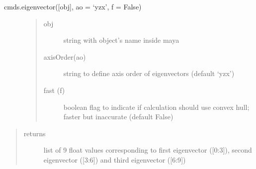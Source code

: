 \documentclass[letterpaper,10pt,english]{sphinxmanual}
\begin{document}
 cmds.eigenvector({[}obj{]}, ao = ‘yzx’, f = False)
\begin{description}
\item[{}] \leavevmode\begin{quote}\begin{description}
\item[{obj}] \leavevmode
string with object’s name inside maya

\item[{axisOrder(ao)}] \leavevmode
string to define axis order of eigenvectors (default ‘yzx’)

\item[{fast (f)}] \leavevmode
boolean flag to indicate if calculation should use convex hull; faster but inaccurate (default False)

\end{description}\end{quote}

\end{description}
\begin{quote}\begin{description}
\item[{returns}] \leavevmode
list of 9 float values corresponding to first eigenvector ({[}0:3{]}), second eigenvector ({[}3:6{]}) and third eigenvector ({[}6:9{]})

\end{description}\end{quote}
\begin{description}
\item[{}] \leavevmode
\begin{sphinxVerbatim}[commandchars=\\\{\}]
\end{sphinxVerbatim}

\end{description}
\end{document}
